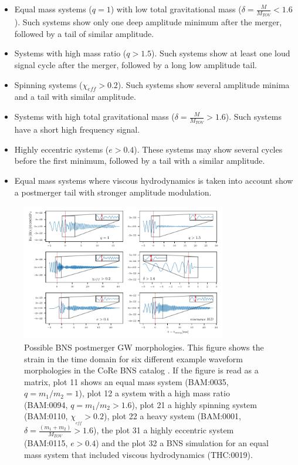 \begin{itemize}
\item Equal mass systems ($q=1$) with low total gravitational mass ($\delta=\frac{M}{M_{TOV}}<1.6$). Such systems show only one deep amplitude minimum after the merger, followed by a tail of similar amplitude.

\item Systems with high mass ratio ($q>1.5$). Such systems show at least one loud signal cycle after the merger, followed by a long low amplitude tail.

\item Spinning systems ($\chi_{eff}>0.2$). Such systems show several amplitude minima and a tail with similar amplitude.

\item Systems with high total gravitational mass ($\delta=\frac{M}{M_{TOV}}>1.6$). Such systems have a short high frequency signal.

\item Highly eccentric systems ($e>0.4$). These systems may show several cycles before the first minimum, followed by a tail with a similar amplitude.

\item Equal mass systems where viscous hydrodynamics is taken into account show a postmerger tail with stronger amplitude modulation.

\end{itemize}


\begin{figure}[hbt!]
\begin{center}
\includegraphics[width=0.8\textwidth, angle=0]{images/Data_analysis/results/postm_wf_grid.pdf}
\captionsetup{width=0.8\textwidth}
\caption[Possible BNS postmerger GW morphologies]{Possible BNS postmerger GW morphologies. This figure shows the strain in the time domain for six different example waveform morphologies in the CoRe BNS catalog \cite{Dietrich:2018phi}. If the figure is read as a matrix, plot 11 shows an equal mass system (BAM:0035, $q=m_1/m_2=1$), plot 12 a system with a high mass ratio (BAM:0094, $q=m_1/m_2>1.6$), plot 21 a highly spinning system (BAM:0110, $\chi_{_{eff}}>0.2$), plot 22 a heavy system (BAM:0001, $\delta=\frac{(m_1+m_2)}{M_{TOV}}>1.6$), the plot 31 a highly eccentric system (BAM:0115, $e>0.4$) and the plot 32 a BNS simulation for an equal mass system that included viscous hydrodynamics (THC:0019).}
\label{fig:101}
\end{center}
\end{figure}

